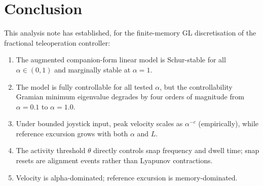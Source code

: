 \documentclass[11pt,a4paper]{article}
\theoremstyle{definition}
\begin{document}
\section*{Conclusion}

This analysis note has established, for the finite-memory GL discretisation
of the fractional teleoperation controller:
\begin{enumerate}[noitemsep]
  \item The augmented companion-form linear model is Schur-stable for all
        $\alpha \in (0,1)$ and marginally stable at $\alpha = 1$.
  \item The model is fully controllable for all tested $\alpha$, but the
        controllability Gramian minimum eigenvalue degrades by four orders of
        magnitude from $\alpha = 0.1$ to $\alpha = 1.0$.
  \item Under bounded joystick input, peak velocity scales as
        $\alpha^{-c}$ (empirically), while reference excursion grows with
        both $\alpha$ and $L$.
  \item The activity threshold $\theta$ directly controls snap frequency
        and dwell time; snap resets are alignment events rather than
        Lyapunov contractions.
  \item Velocity is alpha-dominated; reference excursion is memory-dominated.
\end{enumerate}
\end{document}
